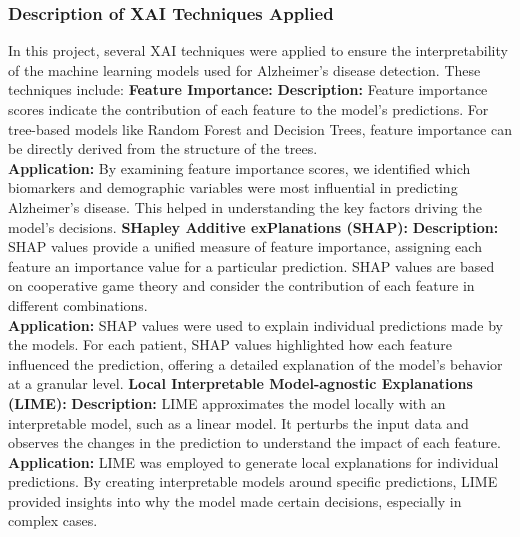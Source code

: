 \documentclass[a4paper,12pt]{report}
\begin{document}
\subsubsection{Description of XAI Techniques Applied}
In this project, several XAI techniques were applied to ensure the interpretability of the machine learning models used for Alzheimer's disease detection. These techniques include:
{}
\newline{}
\newline\textbf{Feature Importance:}
\newline\textbf{Description:} Feature importance scores indicate the contribution of each feature to the model's predictions. For tree-based models like Random Forest and Decision Trees, feature importance can be directly derived from the structure of the trees. \\
\textbf{Application:} By examining feature importance scores, we identified which biomarkers and demographic variables were most influential in predicting Alzheimer's disease. This helped in understanding the key factors driving the model's decisions.
{}
\newline{}
\newline\textbf{SHapley Additive exPlanations (SHAP):}
\newline\textbf{Description:} SHAP values provide a unified measure of feature importance, assigning each feature an importance value for a particular prediction. SHAP values are based on cooperative game theory and consider the contribution of each feature in different combinations. \cite{shap_paper}\\
\textbf{Application:} SHAP values were used to explain individual predictions made by the models. For each patient, SHAP values highlighted how each feature influenced the prediction, offering a detailed explanation of the model's behavior at a granular level.
{}
\newline{}
\newline\textbf{Local Interpretable Model-agnostic Explanations (LIME):}
\newline\textbf{Description:} LIME approximates the model locally with an interpretable model, such as a linear model. It perturbs the input data and observes the changes in the prediction to understand the impact of each feature. \cite{lime_paper} \\
\textbf{Application:} LIME was employed to generate local explanations for individual predictions. By creating interpretable models around specific predictions, LIME provided insights into why the model made certain decisions, especially in complex cases.
\end{document}

